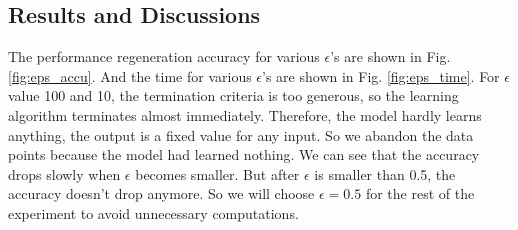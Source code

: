 %
%
\subsection{Results and Discussions}
The performance regeneration accuracy for various $\epsilon$'s are shown in Fig. \ref{fig:eps_accu}. And the time for various $\epsilon$'s are shown in Fig. \ref{fig:eps_time}. For $\epsilon$ value 100 and 10, the termination criteria is too generous, so the learning algorithm terminates almost immediately. Therefore, the model hardly learns anything, the output is a fixed value for any input. So we abandon the data points because the model had learned nothing. We can see that the accuracy drops slowly when $\epsilon$ becomes smaller. But after $\epsilon$ is smaller than 0.5, the accuracy doesn't drop anymore. So we will choose $\epsilon = 0.5 $ for the rest of the experiment to avoid unnecessary computations.

